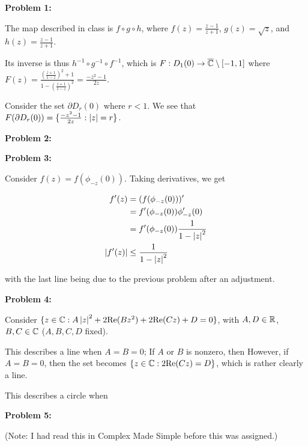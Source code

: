 \documentclass[a4paper,12pt]{article}
\begin{document}
{\bf Problem 1:} %

The map described in class is $f\circ g \circ h$, where $f(z) = \frac{z-1}{z+1}$, $g(z) = \sqrt{z}$, and $h(z) = \frac{z-1}{z+1}$.

Its inverse is thus $h^{-1} \circ g^{-1} \circ f^{-1}$, which is $F: D_1(0) \to \overline{\mathbb{C}} \setminus [-1,1]$ where $F(z) = \frac{\left(\frac{z+1}{1-z}\right)^2 + 1}{1-\left(\frac{z+1}{1-z}\right)^2} = \frac{-z^2-1}{2z}$.

Consider the set $\partial D_r(0)$ where $r < 1$. We see that $F(\partial D_r(0)) = \{\frac{-z^2-1}{2z}: \left\lvert z \right\rvert = r\}$. 

\shunt

{\bf Problem 2:}


\shunt

{\bf Problem 3:}

Consider $f(z) = f(\phi_{-z}(0))$. Taking derivatives, we get

\begin{align*}
f'(z) &= (f(\phi_{-z}(0)))'\\
&= f'(\phi_{-z}(0))\phi_{-z}'(0)\\
&= f'(\phi_{-z}(0))\frac{1}{1-\left\lvert z \right\rvert^2}\\
\left\lvert f'(z) \right\rvert&\leq \frac{1}{1-\left\lvert z \right\rvert^2}\\
\end{align*}

with the last line being due to the previous problem after an adjustment. %

\shunt

{\bf Problem 4:}

Consider $\{z \in \mathbb{C}: A \left\lvert z \right\rvert^2 + 2\text{Re}(Bz^2) + 2\text{Re}(Cz) + D = 0\}$, with $A,D \in \mathbb{R}$, $B,C \in \mathbb{C}$ ($A,B,C,D$ fixed).

This describes a line when $A=B=0$; If $A$ or $B$ is nonzero, then %
However, if $A=B=0$, then the set becomes $\{z \in \mathbb{C}: 2\text{Re}(Cz) = D\}$, which is rather clearly a line.

This describes a circle when %

\shunt

{\bf Problem 5:}

(Note: I had read this in Complex Made Simple before this was assigned.)
\end{document}
